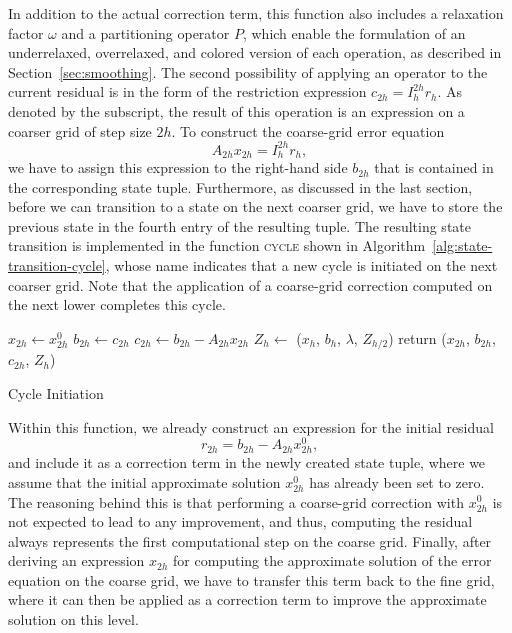 In addition to the actual correction term, this function also includes a relaxation factor $\omega$ and a partitioning operator $P$, which enable the formulation of an underrelaxed, overrelaxed, and colored version of each operation, as described in Section~\ref{sec:smoothing}.
The second possibility of applying an operator to the current residual is in the form of the restriction expression $c_{2h} = I_{h}^{2h} r_h$.
As denoted by the subscript, the result of this operation is an expression on a coarser grid of step size $2h$.
To construct the coarse-grid error equation 
\begin{equation*}
A_{2h} x_{2h} = I_{h}^{2h} r_h,
\end{equation*} 
we have to assign this expression to the right-hand side $b_{2h}$ that is contained in the corresponding state tuple.
Furthermore, as discussed in the last section, before we can transition to a state on the next coarser grid, we have to store the previous state in the fourth entry of the resulting tuple.
The resulting state transition is implemented in the function \textsc{cycle} shown in Algorithm~\ref{alg:state-transition-cycle}, whose name indicates that a new cycle is initiated on the next coarser grid.
Note that the application of a coarse-grid correction computed on the next lower completes this cycle. 
\begin{algorithm}
	\begin{algorithmic}
		\State $x_{2h} \gets x_{2h}^0$ 
		\State $b_{2h} \gets c_{2h}$
		\State $c_{2h} \gets b_{2h} - A_{2h} x_{2h}$ 
		\State $Z_h \gets$ ($x_{h}$, $b_{h}$, $\lambda$, $Z_{h/2}$)
		\State return ($x_{2h}$, $b_{2h}$, $c_{2h}$, $Z_h$)
	\EndFunction
	\end{algorithmic}
 \caption{Cycle Initiation}
\label{alg:state-transition-cycle}
\end{algorithm}
Within this function, we already construct an expression for the initial residual
\begin{equation*}
	r_{2h} = b_{2h} - A_{2h} x_{2h}^0,
\end{equation*} 
and include it as a correction term in the newly created state tuple, where we assume that the initial approximate solution $x^0_{2h}$ has already been set to zero.
The reasoning behind this is that performing a coarse-grid correction with $x^0_{2h}$ is not expected to lead to any improvement, and thus, computing the residual always represents the first computational step on the coarse grid.
Finally, after deriving an expression $x_{2h}$ for computing the approximate solution of the error equation on the coarse grid, we have to transfer this term back to the fine grid, where it can then be applied as a correction term to improve the approximate solution on this level.
